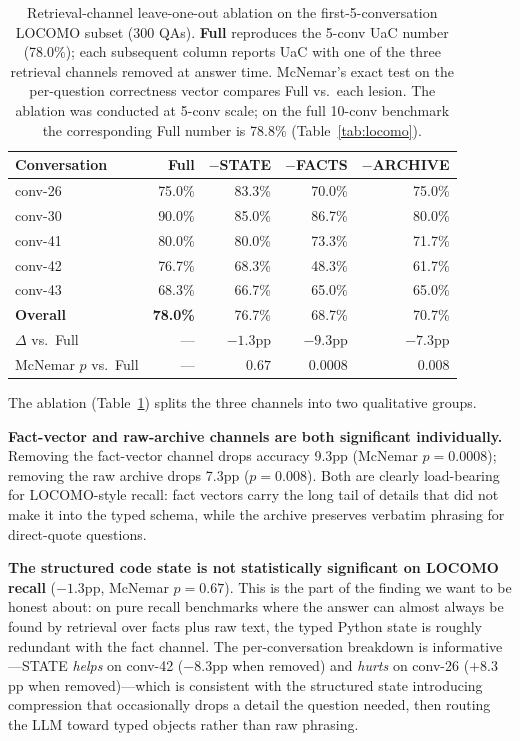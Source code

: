 \begin{table}[!ht]
\centering
\caption{Retrieval-channel leave-one-out ablation on the first-5-conversation LOCOMO subset (300 QAs). \textbf{Full} reproduces the 5-conv UaC number (78.0\%); each subsequent column reports UaC with one of the three retrieval channels removed at answer time. McNemar's exact test on the per-question correctness vector compares Full vs.\ each lesion. The ablation was conducted at 5-conv scale; on the full 10-conv benchmark the corresponding Full number is 78.8\% (Table~\ref{tab:locomo}).}
\label{tab:channel-ablation}
\small
\begin{tabular}{@{}lrrrr@{}}
\toprule
\textbf{Conversation} & \textbf{Full} & $-$\textbf{STATE} & $-$\textbf{FACTS} & $-$\textbf{ARCHIVE} \\
\midrule
conv-26 & 75.0\% & 83.3\% & 70.0\% & 75.0\% \\
conv-30 & 90.0\% & 85.0\% & 86.7\% & 80.0\% \\
conv-41 & 80.0\% & 80.0\% & 73.3\% & 71.7\% \\
conv-42 & 76.7\% & 68.3\% & 48.3\% & 61.7\% \\
conv-43 & 68.3\% & 66.7\% & 65.0\% & 65.0\% \\
\midrule
\textbf{Overall} & \textbf{78.0\%} & 76.7\% & 68.7\% & 70.7\% \\
$\Delta$ vs.\ Full & --- & $-1.3$pp & $-9.3$pp & $-7.3$pp \\
McNemar $p$ vs.\ Full & --- & $0.67$ & $0.0008$ & $0.008$ \\
\bottomrule
\end{tabular}
\end{table}

The ablation (Table~\ref{tab:channel-ablation}) splits the three channels into two qualitative groups.

\textbf{Fact-vector and raw-archive channels are both significant individually.} Removing the fact-vector channel drops accuracy 9.3pp (McNemar $p{=}0.0008$); removing the raw archive drops 7.3pp ($p{=}0.008$). Both are clearly load-bearing for LOCOMO-style recall: fact vectors carry the long tail of details that did not make it into the typed schema, while the archive preserves verbatim phrasing for direct-quote questions.

\textbf{The structured code state is not statistically significant on LOCOMO recall} ($-1.3$pp, McNemar $p{=}0.67$). This is the part of the finding we want to be honest about: on pure recall benchmarks where the answer can almost always be found by retrieval over facts plus raw text, the typed Python state is roughly redundant with the fact channel. The per-conversation breakdown is informative---STATE \emph{helps} on conv-42 ($-8.3$pp when removed) and \emph{hurts} on conv-26 ($+8.3$pp when removed)---which is consistent with the structured state introducing compression that occasionally drops a detail the question needed, then routing the LLM toward typed objects rather than raw phrasing.

